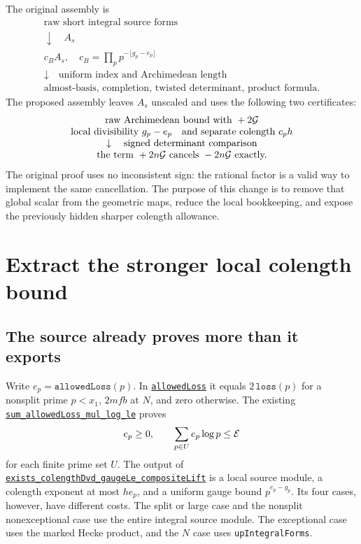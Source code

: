 \documentclass[11pt,letterpaper]{article}
\theoremstyle{remark}\newtheorem{remark}[theorem]{Remark}
\newcommand{\src}[3]{\href{https://github.com/VladimirReshetnikov/ProveIt/blob/89d12dd40424f1217fd818d84877b3da52396a3b/Analysis/GeneralizedRiemannHypothesis/Lean/grh/src/#1.lean\#L#2}{\texttt{#3}}}
\begin{document}
The original assembly is
\[
 \begin{array}{c}
 \text{raw short integral source forms}\\
 \downarrow\quad A_s\\
 c_B A_s,\quad c_B=\displaystyle\prod_p p^{-\lfloor g_p-e_p\rfloor}\\
 \downarrow\quad \text{uniform index and Archimedean length}\\
 \text{almost-basis, completion, twisted determinant, product formula}.
 \end{array}
\]
The proposed assembly leaves $A_s$ unscaled and uses the following two certificates:
\[
 \begin{array}{c}
 \text{raw Archimedean bound with }+2\mathcal G\\
 \text{local divisibility }g_p-e_p\quad\text{and separate colength }c_p h\\
 \downarrow\quad \text{signed determinant comparison}\\
 \text{the term }+2n\mathcal G\text{ cancels }-2n\mathcal G\text{ exactly.}
 \end{array}
\]
The original proof uses no inconsistent sign: the rational factor is a valid way to implement the same cancellation. The purpose of this change is to remove that global scalar from the geometric maps, reduce the local bookkeeping, and expose the previously hidden sharper colength allowance.

\section{Extract the stronger local colength bound}\label{sec:cost}
\subsection{The source already proves more than it exports}
Write $e_p=\texttt{allowedLoss}(p)$. In \src{New/UpperBound/Size/Estimates}{318}{allowedLoss} it equals $2\,\texttt{loss}(p)$ for a nonsplit prime $p<x_1$, $2mfb$ at $N$, and zero otherwise. The existing \src{New/UpperBound/Size/Estimates}{342}{sum\_allowedLoss\_mul\_log\_le} proves
\begin{equation}\label{eq:ebudget}
 e_p\ge0,\qquad \sum_{p\in U}e_p\log p\le\mathcal E
\end{equation}
for each finite prime set $U$. The output of \src{New/UpperBound/Divisibility/LocalDivisibility}{407}{exists\_colengthDvd\_gaugeLe\_compositeLift} is a local source module, a colength exponent at most $he_p$, and a uniform gauge bound $p^{e_p-g_p}$. Its four cases, however, have different costs. The split or large case and the nonsplit nonexceptional case use the entire integral source module. The exceptional case uses the marked Hecke product, and the $N$ case uses \texttt{upIntegralForms}.
\end{document}
